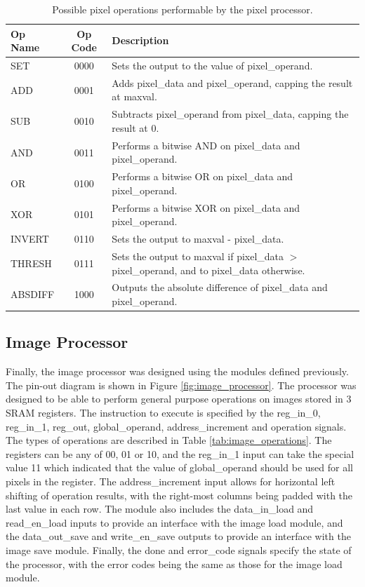 \documentclass[a4paper, 10pt, titlepage]{article}
\begin{document}
\begin{table}
    \centering
    \begin{tabular}[c]{ l | c | p{10cm} }
        \textbf{Op Name} & \textbf{Op Code} & \textbf{Description} \\
        \hline
        SET & 0000 & Sets the output to the value of pixel\_operand. \\
        ADD & 0001 & Adds pixel\_data and pixel\_operand, capping the result at maxval. \\
        SUB & 0010 & Subtracts pixel\_operand from pixel\_data, capping the result at 0. \\
        AND & 0011 & Performs a bitwise AND on pixel\_data and pixel\_operand. \\
        OR & 0100 & Performs a bitwise OR on pixel\_data and pixel\_operand. \\
        XOR & 0101 & Performs a bitwise XOR on pixel\_data and pixel\_operand. \\
        INVERT & 0110 & Sets the output to maxval - pixel\_data. \\
        THRESH & 0111 & Sets the output to maxval if pixel\_data $>$ pixel\_operand, and to pixel\_data otherwise. \\
        ABSDIFF & 1000 & Outputs the absolute difference of pixel\_data and pixel\_operand. \\
    \end{tabular}
    \caption{Possible pixel operations performable by the pixel processor.}
    \label{tab:pixel_operations}
\end{table}

\subsection{Image Processor}

Finally, the image processor was designed using the modules defined previously. The pin-out diagram is shown in Figure \ref{fig:image_processor}. The processor was designed to be able to perform general purpose operations on images stored in 3 SRAM registers. The instruction to execute is specified by the reg\_in\_0, reg\_in\_1, reg\_out, global\_operand, address\_increment and operation signals. The types of operations are described in Table \ref{tab:image_operations}. The registers can be any of 00, 01 or 10, and the reg\_in\_1 input can take the special value 11 which indicated that the value of global\_operand should be used for all pixels in the register. The address\_increment input allows for horizontal left shifting of operation results, with the right-most columns being padded with the last value in each row. The module also includes the data\_in\_load and read\_en\_load inputs to provide an interface with the image load module, and the data\_out\_save and write\_en\_save outputs to provide an interface with the image save module. Finally, the done and error\_code signals specify the state of the processor, with the error codes being the same as those for the image load module.
\end{document}
